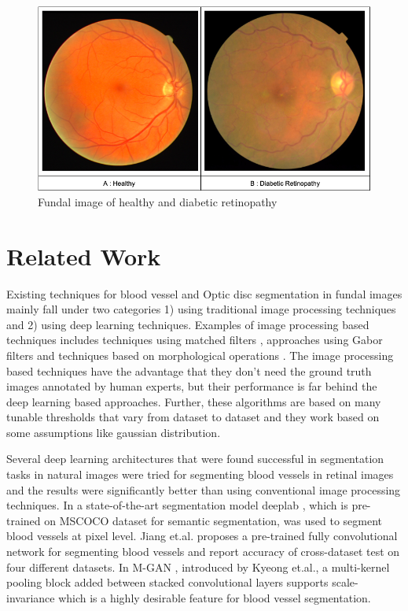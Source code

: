 \begin{figure}[!ht]
  \centering
  \includegraphics[width=\linewidth]{images/Comparison.png}
  \caption{Fundal image of healthy and diabetic retinopathy }
  \label{healthy_vs_dr}
\end{figure}

\section{Related Work}
Existing  techniques for blood vessel and Optic disc segmentation in fundal images mainly fall under two categories 1) using traditional image processing techniques and 2) using deep learning techniques.
Examples of image processing based techniques includes techniques using matched filters \cite{zhang2010retinal} \cite{hoover2000locating}, approaches using Gabor filters \cite{yavuz2011retinal} \cite{aslan2018segmentation} and techniques based on morphological operations \cite{hassan2015retinal}\cite{singh2014new} \cite{sumathy2012retinal}.
The image processing based techniques have the advantage that they don’t need the ground truth images annotated by human experts, but their performance is far behind the deep learning based approaches.
Further, these algorithms are based on many tunable thresholds that vary from dataset to dataset and they work based on some assumptions like gaussian distribution.

Several deep learning architectures that were found successful in segmentation tasks \cite{chen2017deeplab}\cite{long2015fully} in natural images were tried for segmenting blood vessels in retinal images and the results were significantly better than using conventional image processing techniques.
In \cite{vengalil2016customizing} a state-of-the-art segmentation model deeplab \cite{chen2017deeplab}, which is pre-trained on MSCOCO dataset \cite{lin2014microsoft}  for semantic segmentation,  was used to segment blood vessels at pixel level.
Jiang et.al. proposes \cite {jiang2018retinal} a  pre-trained fully convolutional network for segmenting blood vessels and report accuracy of cross-dataset test on four different datasets.
In M-GAN \cite{park2020m}, introduced by Kyeong et.al., a multi-kernel pooling block added between stacked convolutional layers supports scale-invariance which is a highly desirable feature for blood vessel segmentation.

